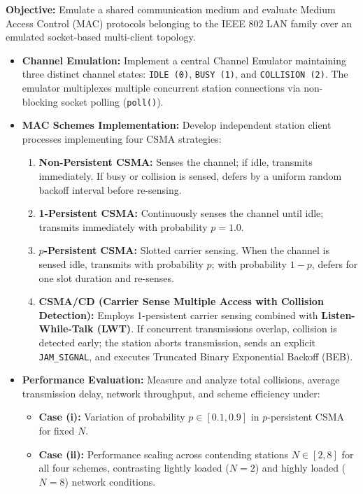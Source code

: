\documentclass[11pt,a4paper]{article}
\begin{document}
\begin{problembox}
\textbf{Objective:} Emulate a shared communication medium and evaluate Medium Access Control (MAC) protocols belonging to the IEEE 802 LAN family over an emulated socket-based multi-client topology.
\begin{itemize}[leftmargin=1.2em]
    \item \textbf{Channel Emulation:} Implement a central Channel Emulator maintaining three distinct channel states: \texttt{IDLE (0)}, \texttt{BUSY (1)}, and \texttt{COLLISION (2)}. The emulator multiplexes multiple concurrent station connections via non-blocking socket polling (\texttt{poll()}).
    \item \textbf{MAC Schemes Implementation:} Develop independent station client processes implementing four CSMA strategies:
    \begin{enumerate}[label=\textbf{(\alph*)}, leftmargin=1.4em]
        \item \textbf{Non-Persistent CSMA:} Senses the channel; if idle, transmits immediately. If busy or collision is sensed, defers by a uniform random backoff interval before re-sensing.
        \item \textbf{1-Persistent CSMA:} Continuously senses the channel until idle; transmits immediately with probability $p=1.0$.
        \item \textbf{$p$-Persistent CSMA:} Slotted carrier sensing. When the channel is sensed idle, transmits with probability $p$; with probability $1-p$, defers for one slot duration and re-senses.
        \item \textbf{CSMA/CD (Carrier Sense Multiple Access with Collision Detection):} Employs 1-persistent carrier sensing combined with \textbf{Listen-While-Talk (LWT)}. If concurrent transmissions overlap, collision is detected early; the station aborts transmission, sends an explicit \texttt{JAM\_SIGNAL}, and executes Truncated Binary Exponential Backoff (BEB).
    \end{enumerate}
    \item \textbf{Performance Evaluation:} Measure and analyze total collisions, average transmission delay, network throughput, and scheme efficiency under:
    \begin{itemize}
        \item \textbf{Case (i):} Variation of probability $p \in [0.1, 0.9]$ in $p$-persistent CSMA for fixed $N$.
        \item \textbf{Case (ii):} Performance scaling across contending stations $N \in [2, 8]$ for all four schemes, contrasting lightly loaded ($N=2$) and highly loaded ($N=8$) network conditions.
    \end{itemize}
\end{itemize}
\end{problembox}
\end{document}
